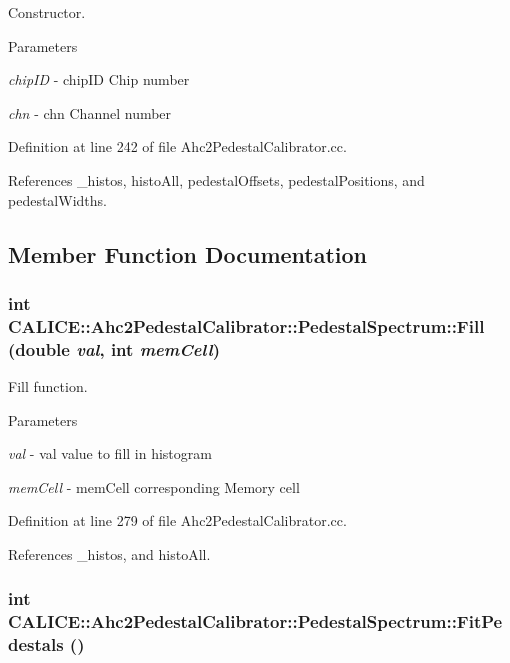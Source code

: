 Constructor. 
\begin{DoxyParams}{Parameters}
\item[{\em chipID}]-\/ chipID Chip number \item[{\em chn}]-\/ chn Channel number \end{DoxyParams}


Definition at line 242 of file Ahc2PedestalCalibrator.cc.

References \_\-histos, histoAll, pedestalOffsets, pedestalPositions, and pedestalWidths.

\subsection{Member Function Documentation}
\subsubsection[{Fill}]{\setlength{\rightskip}{0pt plus 5cm}int CALICE::Ahc2PedestalCalibrator::PedestalSpectrum::Fill (double {\em val}, \/  int {\em memCell})}\label{classCALICE_1_1Ahc2PedestalCalibrator_1_1PedestalSpectrum_ab3a29297665c58f3212ef8762700722d}


Fill function. 
\begin{DoxyParams}{Parameters}
\item[{\em val}]-\/ val value to fill in histogram \item[{\em memCell}]-\/ memCell corresponding Memory cell \end{DoxyParams}


Definition at line 279 of file Ahc2PedestalCalibrator.cc.

References \_\-histos, and histoAll.
\subsubsection[{FitPedestals}]{\setlength{\rightskip}{0pt plus 5cm}int CALICE::Ahc2PedestalCalibrator::PedestalSpectrum::FitPedestals ()}\label{classCALICE_1_1Ahc2PedestalCalibrator_1_1PedestalSpectrum_a16d0ff7218c5cd15138dae353425a86b}


